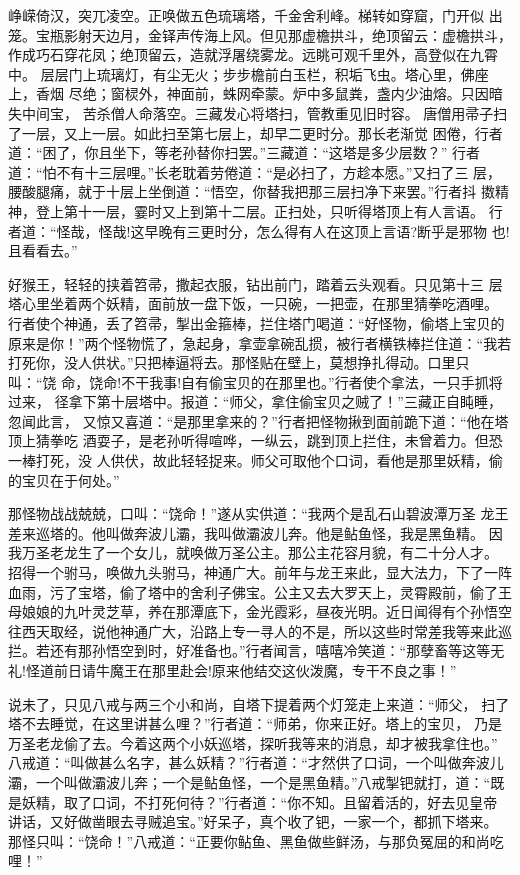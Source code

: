 峥嵘倚汉，突兀凌空。正唤做五色琉璃塔，千金舍利峰。梯转如穿窟，门开似
出笼。宝瓶影射天边月，金铎声传海上风。但见那虚檐拱斗，绝顶留云：虚檐拱斗，
作成巧石穿花凤；绝顶留云，造就浮屠绕雾龙。远眺可观千里外，高登似在九霄中。
层层门上琉璃灯，有尘无火；步步檐前白玉栏，积垢飞虫。塔心里，佛座上，香烟
尽绝；窗棂外，神面前，蛛网牵蒙。炉中多鼠粪，盏内少油熔。只因暗失中间宝，
苦杀僧人命落空。三藏发心将塔扫，管教重见旧时容。
唐僧用帚子扫了一层，又上一层。如此扫至第七层上，却早二更时分。那长老渐觉
困倦，行者道：“困了，你且坐下，等老孙替你扫罢。”三藏道：“这塔是多少层数？”
行者道：“怕不有十三层哩。”长老耽着劳倦道：“是必扫了，方趁本愿。”又扫了三
层，腰酸腿痛，就于十层上坐倒道：“悟空，你替我把那三层扫净下来罢。”行者抖
擞精神，登上第十一层，霎时又上到第十二层。正扫处，只听得塔顶上有人言语。
行者道：“怪哉，怪哉!这早晚有三更时分，怎么得有人在这顶上言语?断乎是邪物
也!且看看去。”

好猴王，轻轻的挟着笤帚，撒起衣服，钻出前门，踏着云头观看。只见第十三
层塔心里坐着两个妖精，面前放一盘下饭，一只碗，一把壶，在那里猜拳吃酒哩。
行者使个神通，丢了笤帚，掣出金箍棒，拦住塔门喝道：“好怪物，偷塔上宝贝的
原来是你！”两个怪物慌了，急起身，拿壶拿碗乱掼，被行者横铁棒拦住道：“我若
打死你，没人供状。”只把棒逼将去。那怪贴在壁上，莫想挣扎得动。口里只叫：“饶
命，饶命!不干我事!自有偷宝贝的在那里也。”行者使个拿法，一只手抓将过来，
径拿下第十层塔中。报道：“师父，拿住偷宝贝之贼了！”三藏正自盹睡，忽闻此言，
又惊又喜道：“是那里拿来的？”行者把怪物揪到面前跪下道：“他在塔顶上猜拳吃
酒耍子，是老孙听得喧哗，一纵云，跳到顶上拦住，未曾着力。但恐一棒打死，没
人供伏，故此轻轻捉来。师父可取他个口词，看他是那里妖精，偷的宝贝在于何处。”

那怪物战战兢兢，口叫：“饶命！”遂从实供道：“我两个是乱石山碧波潭万圣
龙王差来巡塔的。他叫做奔波儿灞，我叫做灞波儿奔。他是鲇鱼怪，我是黑鱼精。
因我万圣老龙生了一个女儿，就唤做万圣公主。那公主花容月貌，有二十分人才。
招得一个驸马，唤做九头驸马，神通广大。前年与龙王来此，显大法力，下了一阵
血雨，污了宝塔，偷了塔中的舍利子佛宝。公主又去大罗天上，灵霄殿前，偷了王
母娘娘的九叶灵芝草，养在那潭底下，金光霞彩，昼夜光明。近日闻得有个孙悟空
往西天取经，说他神通广大，沿路上专一寻人的不是，所以这些时常差我等来此巡
拦。若还有那孙悟空到时，好准备也。”行者闻言，嘻嘻冷笑道：“那孽畜等这等无
礼!怪道前日请牛魔王在那里赴会!原来他结交这伙泼魔，专干不良之事！”

说未了，只见八戒与两三个小和尚，自塔下提着两个灯笼走上来道：“师父，
扫了塔不去睡觉，在这里讲甚么哩？”行者道：“师弟，你来正好。塔上的宝贝，
乃是万圣老龙偷了去。今着这两个小妖巡塔，探听我等来的消息，却才被我拿住也。”
八戒道：“叫做甚么名字，甚么妖精？”行者道：“才然供了口词，一个叫做奔波儿
灞，一个叫做灞波儿奔；一个是鲇鱼怪，一个是黑鱼精。”八戒掣钯就打，道：“既
是妖精，取了口词，不打死何待？”行者道：“你不知。且留着活的，好去见皇帝
讲话，又好做凿眼去寻贼追宝。”好呆子，真个收了钯，一家一个，都抓下塔来。
那怪只叫：“饶命！”八戒道：“正要你鲇鱼、黑鱼做些鲜汤，与那负冤屈的和尚吃
哩！”

